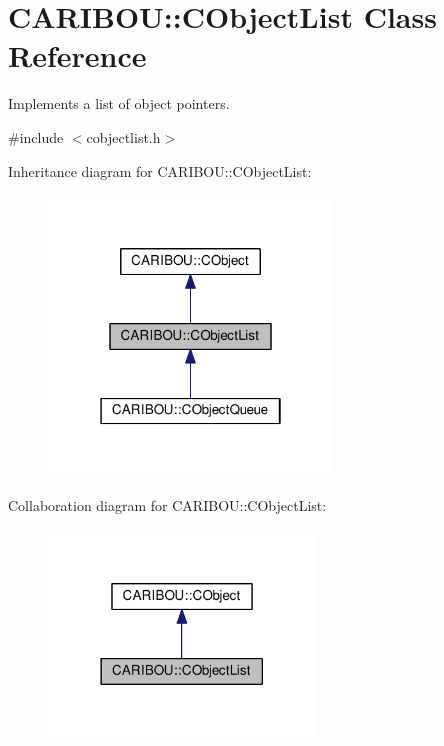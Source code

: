 \section{C\+A\+R\+I\+B\+OU\+:\+:C\+Object\+List Class Reference}
\label{class_c_a_r_i_b_o_u_1_1_c_object_list}


Implements a list of object pointers.  




{\ttfamily \#include $<$cobjectlist.\+h$>$}



Inheritance diagram for C\+A\+R\+I\+B\+OU\+:\+:C\+Object\+List\+:
\nopagebreak
\begin{figure}[H]
\begin{center}
\leavevmode
\includegraphics[width=214pt]{class_c_a_r_i_b_o_u_1_1_c_object_list__inherit__graph}
\end{center}
\end{figure}


Collaboration diagram for C\+A\+R\+I\+B\+OU\+:\+:C\+Object\+List\+:\nopagebreak
\begin{figure}[H]
\begin{center}
\leavevmode
\includegraphics[width=201pt]{class_c_a_r_i_b_o_u_1_1_c_object_list__coll__graph}
\end{center}
\end{figure}
